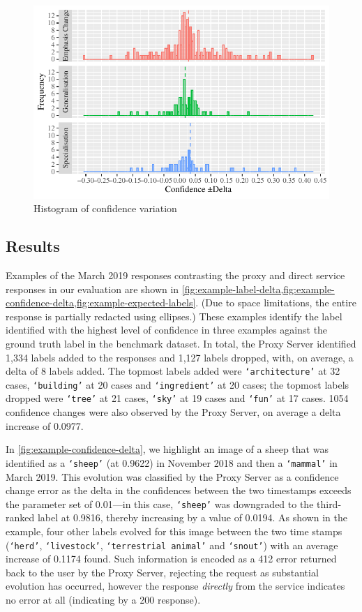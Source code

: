 \begin{figure}[t]
    \centering
    \includegraphics[width=\linewidth]{frequency}
    \caption{Histogram of confidence variation}
    \label{fig:frequency}
\end{figure}

\subsection{Results}

Examples of the March 2019 responses contrasting the proxy and direct service responses in our evaluation are shown in \cref{fig:example-label-delta,fig:example-confidence-delta,fig:example-expected-labels}. (Due to space limitations, the entire  response is partially redacted using ellipses.) These examples identify the label identified with the highest level of confidence in three examples against the ground truth label in the benchmark dataset. In total, the Proxy Server identified 1,334 labels added to the responses and 1,127 labels dropped, with, on average, a delta of 8 labels added. The topmost labels added were \texttt{`architecture'} at 32 cases, \texttt{`building'} at 20 cases and \texttt{`ingredient'} at 20 cases; the topmost labels dropped were \texttt{`tree'} at 21 cases, \texttt{`sky'} at 19 cases and \texttt{`fun'} at 17 cases. 1054 confidence changes were also observed by the Proxy Server, on average a delta increase of 0.0977. 

In \cref{fig:example-confidence-delta}, we highlight an image of a sheep that was identified as a \texttt{`sheep'} (at 0.9622) in November 2018 and then a \texttt{`mammal'} in March 2019. This evolution was classified by the Proxy Server as a confidence change error as the delta in the confidences between the two timestamps exceeds the parameter set of 0.01---in this case, \texttt{`sheep'} was downgraded to the third-ranked label at 0.9816, thereby increasing by a value of 0.0194. As shown in the example, four other labels evolved for this image between the two time stamps (\texttt{`herd'}, \texttt{`livestock'}, \texttt{`terrestrial animal'} and \texttt{`snout'}) with an average increase of 0.1174 found. Such information is encoded as a 412  error returned back to the user by the Proxy Server, rejecting the request as substantial evolution has occurred, however the response \textit{directly} from the service indicates no error at all (indicating by a 200  response).


